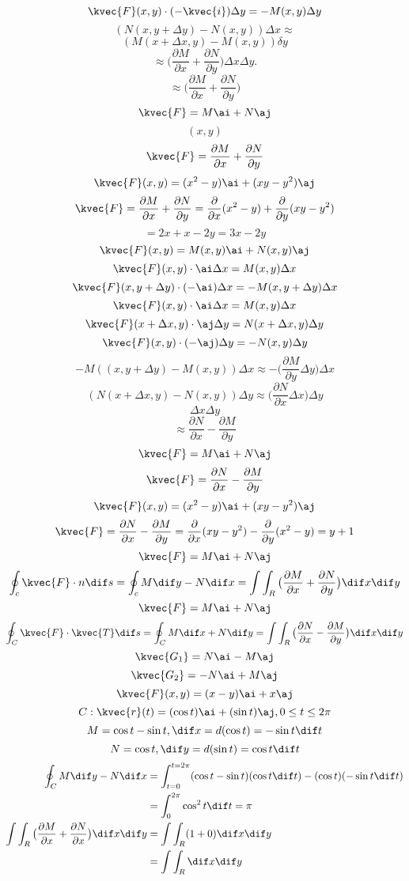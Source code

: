 \[\kvec{F}(x,y)\cdot (-\kvec{i})\Delta y=-M(x,y)\Delta y\]
\[(N(x,y+\Delta y)-N(x,y))\Delta x\approx\]
\[(M(x+\Delta x,y)-M(x,y))\delta y\]
\[\approx \big(\frac{\partial{M}}{\partial{x}}+\frac{\partial{N}}{\partial{y}}\big)\Delta x \Delta y.\]
\[\approx \big(\frac{\partial{M}}{\partial{x}}+\frac{\partial{N}}{\partial{y}}\big)\]
\[\kvec{F}=M\ai+N\aj\]
\[(x,y)\]
\[\kvec{F}=\frac{\partial{M}}{\partial{x}}+\frac{\partial{N}}{\partial{y}}\]
\[\kvec{F}(x,y)=(x^{2}-y)\ai+(xy-y^{2})\aj\]
\[\kvec{F}=\frac{\partial{M}}{\partial{x}}+\frac{\partial{N}}{\partial{y}}=\frac{\partial}{\partial{x}}(x^{2}-y)+\frac{\partial}{\partial{y}}(xy-y^{2})\]
\[=2x+x-2y=3x-2y\]
\[\kvec{F}(x,y)=M(x,y)\ai+N(x,y)\aj\]
\[\kvec{F}(x,y)\cdot \ai\Delta x=M(x,y)\Delta x\]
\[\kvec{F}(x,y+\Delta y)\cdot (-\ai)\Delta x=-M(x,y+\Delta y)\Delta x\]
\[\kvec{F}(x,y)\cdot \ai \Delta x=M(x,y)\Delta x\]
\[\kvec{F}(x+\Delta x,y)\cdot \aj \Delta y=N(x+\Delta x, y)\Delta y\]
\[\kvec{F}(x,y)\cdot (-\aj)\Delta y=-N(x,y)\Delta y\]
\[-M((x,y+\Delta y)-M(x,y))\Delta x \approx -\big(\frac{\partial{M}}{\partial{y}}\Delta y\big)\Delta x\]
\[(N(x+\Delta x,y)-N(x,y))\Delta y \approx \big(\frac{\partial{N}}{\partial{x}}\Delta x\big)\Delta y\]
\[\Delta x \Delta y\]
\[\approx \frac{\partial{N}}{\partial{x}}-\frac{\partial{M}}{\partial{y}}\]
\[\kvec{F}=M\ai+N\aj\]
\[\kvec{F}= \frac{\partial{N}}{\partial{x}}-\frac{\partial{M}}{\partial{y}}\]
\[\kvec{F}(x,y)=(x^{2}-y)\ai+(xy-y^{2})\aj\]
\[\kvec{F}=\frac{\partial{N}}{\partial{x}}-\frac{\partial{M}}{\partial{y}}=\frac{\partial}{\partial{x}}(xy-y^{2})-\frac{\partial}{\partial{y}}(x^{2}-y)=y+1\]
\[\kvec{F}=M\ai+N\aj\]
\[\oint_{c}\kvec{F}\cdot n\dif s=\oint_{c}M\dif y-N\dif x=\int \int_{R}\big(\frac{\partial{M}}{\partial{x}}+\frac{\partial{N}}{\partial{y}}\big)\dif x\dif y\]
\[\kvec{F}=M\ai+N\aj\]
\[\oint_{C}\kvec{F}\cdot\kvec{T}\dif s=\oint_{C}M\dif x+N\dif y=\int \int_{R}\big(\frac{\partial{N}}{\partial{x}}-\frac{\partial{M}}{\partial{y}}\big)\dif x\dif y\]
\[\kvec{G_{1}}=N\ai-M\aj\]
\[\kvec{G_{2}}=-N\ai+M\aj\]
\[\kvec{F}(x,y)=(x-y)\ai+x\aj\]
\[C: \kvec{r}(t)=(\cos{t})\ai+(\sin{t})\aj,0\le t\le 2\pi\]
\[M=\cos{t}-\sin{t}, \dif x=d(\cos{t})=-\sin{t}\dif t\]
\[N=\cos{t}, \dif y=d(\sin{t})=\cos{t}\dif t\]
\begin{align*}
\oint_{C}M\dif y-N\dif x&=\int_{t=0}^{t=2\pi}(\cos{t}-\sin{t})(\cos{t}\dif t)-(\cos{t})(-\sin{t}\dif t)\\
&=\int_{0}^{2\pi}\cos^{2}{t}\dif t=\pi\\
\int \int_{R}\big(\frac{\partial{M}}{\partial{x}}+\frac{\partial{N}}{\partial{x}}\big)\dif x\dif y&=\int \int_{R}(1+0)\dif x \dif y\\
&=\int \int_{R}\dif x\dif y\\
\end{align*}
